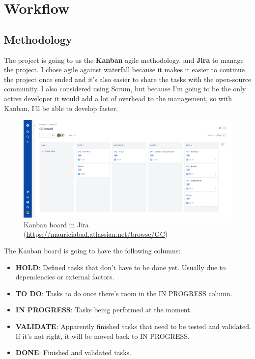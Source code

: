 \section{Workflow}
\label{chap:workflow}

\subsection{Methodology}
The project is going to us the \textbf{Kanban} agile methodology, and \textbf{Jira} to manage the project. I chose agile against waterfall because it makes it easier to continue the project once ended and it's also easier to share the tasks with the open-source community. I also considered using Scrum, but because I'm going to be the only active developer it would add a lot of overhead to the management, so with Kanban, I'll be able to develop faster.

\vspace*{\fill}
\begin{figure}[ht!]
    \center
    \includegraphics[width=1\columnwidth,frame]{media/jira-board-gep.png}
    \caption[Kanban board in Jira]{Kanban board in Jira (\url{https://mauriciabad.atlassian.net/browse/GC})}
    \label{jira-board-gep}
\end{figure}
\vspace*{\fill}

\newpage
The Kanban board is going to have the following columns:
\begin{itemize}
    \item \textbf{HOLD}: Defined tasks that don't have to be done yet. Usually due to dependencies or external factors.
    \item \textbf{TO DO}: Tasks to do once there's room in the IN PROGRESS column.
    \item \textbf{IN PROGRESS}: Tasks being performed at the moment.
    \item \textbf{VALIDATE}: Apparently finished tasks that need to be tested and validated. If it's not right, it will be moved back to IN PROGRESS.
    \item \textbf{DONE}: Finished and validated tasks.
\end{itemize}

